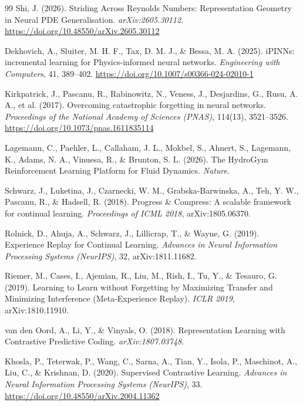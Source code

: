 \documentclass[11pt,a4paper]{article}
\begin{document}
\begin{thebibliography}{99}
Shi, J. (2026). Striding Across Reynolds Numbers: Representation Geometry in Neural PDE Generalisation. \textit{arXiv:2605.30112}. \url{https://doi.org/10.48550/arXiv.2605.30112}

Dekhovich, A., Sluiter, M. H. F., Tax, D. M. J., \& Bessa, M. A. (2025). iPINNs: incremental learning for Physics-informed neural networks. \textit{Engineering with Computers}, 41, 389--402. \url{https://doi.org/10.1007/s00366-024-02010-1}

Kirkpatrick, J., Pascanu, R., Rabinowitz, N., Veness, J., Desjardins, G., Rusu, A. A., et al. (2017). Overcoming catastrophic forgetting in neural networks. \textit{Proceedings of the National Academy of Sciences (PNAS)}, 114(13), 3521--3526. \url{https://doi.org/10.1073/pnas.1611835114}

Lagemann, C., Paehler, L., Callaham, J. L., Mokbel, S., Ahnert, S., Lagemann, K., Adams, N. A., Vinuesa, R., \& Brunton, S. L. (2026). The HydroGym Reinforcement Learning Platform for Fluid Dynamics. \textit{Nature}.

Schwarz, J., Luketina, J., Czarnecki, W. M., Grabska-Barwinska, A., Teh, Y. W., Pascanu, R., \& Hadsell, R. (2018). Progress \& Compress: A scalable framework for continual learning. \textit{Proceedings of ICML 2018}, arXiv:1805.06370.

Rolnick, D., Ahuja, A., Schwarz, J., Lillicrap, T., \& Wayne, G. (2019). Experience Replay for Continual Learning. \textit{Advances in Neural Information Processing Systems (NeurIPS)}, 32, arXiv:1811.11682.

Riemer, M., Cases, I., Ajemian, R., Liu, M., Rish, I., Tu, Y., \& Tesauro, G. (2019). Learning to Learn without Forgetting by Maximizing Transfer and Minimizing Interference (Meta-Experience Replay). \textit{ICLR 2019}, arXiv:1810.11910.

van den Oord, A., Li, Y., \& Vinyals, O. (2018). Representation Learning with Contrastive Predictive Coding. \textit{arXiv:1807.03748}.

Khosla, P., Teterwak, P., Wang, C., Sarna, A., Tian, Y., Isola, P., Maschinot, A., Liu, C., \& Krishnan, D. (2020). Supervised Contrastive Learning. \textit{Advances in Neural Information Processing Systems (NeurIPS)}, 33. \url{https://doi.org/10.48550/arXiv.2004.11362}


\end{thebibliography}
\end{document}
